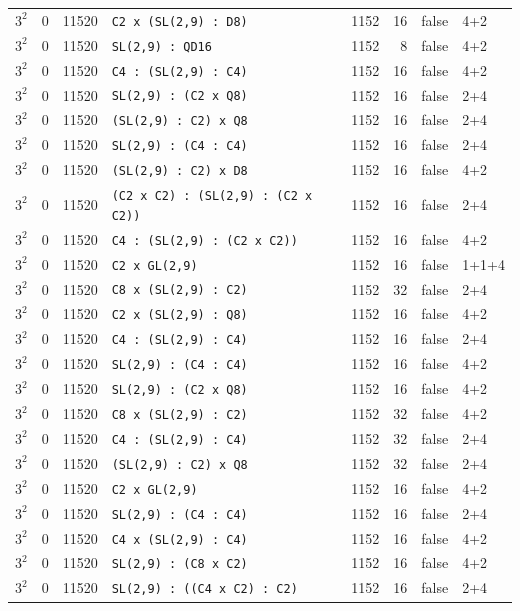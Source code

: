 \begin{longtable}{llrlrrll}
$3^2$ & 0 & 11520 & \texttt{C2 x (SL(2,9) : D8)} & 1152 & 16 & false & 4+2\\
$3^2$ & 0 & 11520 & \texttt{SL(2,9) : QD16} & 1152 & 8 & false & 4+2\\
$3^2$ & 0 & 11520 & \texttt{C4 : (SL(2,9) : C4)} & 1152 & 16 & false & 4+2\\
$3^2$ & 0 & 11520 & \texttt{SL(2,9) : (C2 x Q8)} & 1152 & 16 & false & 2+4\\
$3^2$ & 0 & 11520 & \texttt{(SL(2,9) : C2) x Q8} & 1152 & 16 & false & 2+4\\
$3^2$ & 0 & 11520 & \texttt{SL(2,9) : (C4 : C4)} & 1152 & 16 & false & 2+4\\
$3^2$ & 0 & 11520 & \texttt{(SL(2,9) : C2) x D8} & 1152 & 16 & false & 4+2\\
$3^2$ & 0 & 11520 & \texttt{(C2 x C2) : (SL(2,9) : (C2 x C2))} & 1152 & 16 & false & 2+4\\
$3^2$ & 0 & 11520 & \texttt{C4 : (SL(2,9) : (C2 x C2))} & 1152 & 16 & false & 4+2\\
$3^2$ & 0 & 11520 & \texttt{C2 x GL(2,9)} & 1152 & 16 & false & 1+1+4\\
$3^2$ & 0 & 11520 & \texttt{C8 x (SL(2,9) : C2)} & 1152 & 32 & false & 2+4\\
$3^2$ & 0 & 11520 & \texttt{C2 x (SL(2,9) : Q8)} & 1152 & 16 & false & 4+2\\
$3^2$ & 0 & 11520 & \texttt{C4 : (SL(2,9) : C4)} & 1152 & 16 & false & 2+4\\
$3^2$ & 0 & 11520 & \texttt{SL(2,9) : (C4 : C4)} & 1152 & 16 & false & 4+2\\
$3^2$ & 0 & 11520 & \texttt{SL(2,9) : (C2 x Q8)} & 1152 & 16 & false & 4+2\\
$3^2$ & 0 & 11520 & \texttt{C8 x (SL(2,9) : C2)} & 1152 & 32 & false & 4+2\\
$3^2$ & 0 & 11520 & \texttt{C4 : (SL(2,9) : C4)} & 1152 & 32 & false & 2+4\\
$3^2$ & 0 & 11520 & \texttt{(SL(2,9) : C2) x Q8} & 1152 & 32 & false & 2+4\\
$3^2$ & 0 & 11520 & \texttt{C2 x GL(2,9)} & 1152 & 16 & false & 4+2\\
$3^2$ & 0 & 11520 & \texttt{SL(2,9) : (C4 : C4)} & 1152 & 16 & false & 2+4\\
$3^2$ & 0 & 11520 & \texttt{C4 x (SL(2,9) : C4)} & 1152 & 16 & false & 4+2\\
$3^2$ & 0 & 11520 & \texttt{SL(2,9) : (C8 x C2)} & 1152 & 16 & false & 4+2\\
$3^2$ & 0 & 11520 & \texttt{SL(2,9) : ((C4 x C2) : C2)} & 1152 & 16 & false & 2+4\\

\end{longtable}
